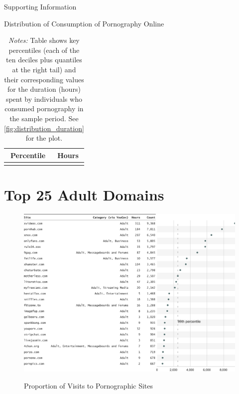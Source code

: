 \documentclass[12pt, letterpaper]{article}
\begin{document}
\begin{center}
\Large{Supporting Information}
\end{center}


\begin{table}[ht] \centering \small \setlength\tabcolsep{10 pt}
	\caption{Distribution of Consumption of Pornography Online}
	\label{tab:distribution_duration}
	\begin{adjustbox}{max width=\textwidth}
		\begin{tabular}{@{\hspace{0\tabcolsep}}cc@{\hspace{0\tabcolsep}}}
			\toprule
			\multicolumn{1}{c}{\textbf{Percentile}}&\multicolumn{1}{c}{\textbf{Hours}}\\
			\midrule
			 \\
			\bottomrule
		\end{tabular}
	\end{adjustbox}
	\caption*{\footnotesize \emph{Notes:} 
		Table shows key percentiles (each of the ten deciles plus quantiles at the right tail) and their corresponding values for the duration (hours) spent by individuals who consumed pornography in the sample period. 
		See \cref{fig:distribution_duration} for the plot.
	}
\end{table}


\clearpage
\section{Top 25 Adult Domains}


\begin{figure}[h]
\centering
\caption{Proportion of Visits to Pornographic Sites}
\includegraphics[width=\textwidth]{../figs/top_25_adultsites.pdf}
\label{fig:top25}
\end{figure}
\end{document}
